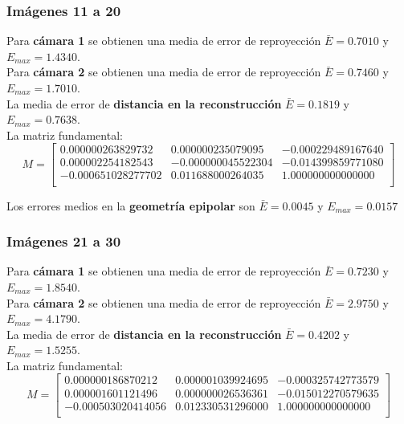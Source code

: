 \documentclass[a4paper, fontsize=11pt]{scrartcl} %
\numberwithin{equation}{section} %
\numberwithin{figure}{section} %
\numberwithin{table}{section} %
\begin{document}
	\subsubsection*{Imágenes 11 a 20}
	
	Para \textbf{cámara 1} se obtienen una media de error de reproyección $\bar{E} = 0.7010$ y $E_{max} = 1.4340$.\\
	Para \textbf{cámara 2} se obtienen una media de error de reproyección $\bar{E} = 0.7460$ y $E_{max} = 1.7010$.\\
	
	La media de error de \textbf{distancia en la reconstrucción} $\bar{E} = 0.1819$ y $E_{max} = 0.7638$.\\
	La matriz fundamental:
	\[
	M=
	\begin{bmatrix}
	0.000000263829732&	0.000000235079095&	-0.000229489167640 \\
	0.000002254182543&	-0.000000045522304&	-0.014399859771080 \\
	-0.000651028277702&	0.011688000264035&	1.000000000000000  \\
	
	\end{bmatrix}
	\]
	
	Los errores medios en la \textbf{geometría epipolar} son $\bar{E} = 0.0045$ y $E_{max} = 0.0157$
	
	\subsubsection*{Imágenes 21 a 30}
	
	Para \textbf{cámara 1} se obtienen una media de error de reproyección $\bar{E} = 0.7230$ y $E_{max} = 1.8540$.\\
	Para \textbf{cámara 2} se obtienen una media de error de reproyección $\bar{E} = 2.9750$ y $E_{max} = 4.1790$.\\
	
	La media de error de \textbf{distancia en la reconstrucción} $\bar{E} = 0.4202$ y $E_{max} = 1.5255$.\\
	La matriz fundamental:
	\[
	M=
	\begin{bmatrix}
	0.000000186870212&	0.000001039924695&	-0.000325742773579 \\
	0.000001601121496&	0.000000026536361&	-0.015012270579635 \\
	-0.000503020414056&	0.012330531296000&	1.000000000000000  \\
	
	\end{bmatrix}
	\]
	
\end{document}
